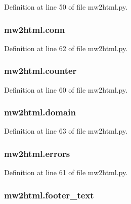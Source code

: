 Definition at line 50 of file mw2html.\+py.

\subsubsection[{\texorpdfstring{conn}{conn}}]{\setlength{\rightskip}{0pt plus 5cm}mw2html.\+conn}\hypertarget{namespacemw2html_a97cceba50a9da89b1bab3ff979d41a2b}{}\label{namespacemw2html_a97cceba50a9da89b1bab3ff979d41a2b}


Definition at line 62 of file mw2html.\+py.

\subsubsection[{\texorpdfstring{counter}{counter}}]{\setlength{\rightskip}{0pt plus 5cm}mw2html.\+counter}\hypertarget{namespacemw2html_a1883350fdf7ae46dbc49d9efc4dace3b}{}\label{namespacemw2html_a1883350fdf7ae46dbc49d9efc4dace3b}


Definition at line 60 of file mw2html.\+py.

\subsubsection[{\texorpdfstring{domain}{domain}}]{\setlength{\rightskip}{0pt plus 5cm}mw2html.\+domain}\hypertarget{namespacemw2html_a673cf42debbef44a18944c885b0e2f31}{}\label{namespacemw2html_a673cf42debbef44a18944c885b0e2f31}


Definition at line 63 of file mw2html.\+py.

\subsubsection[{\texorpdfstring{errors}{errors}}]{\setlength{\rightskip}{0pt plus 5cm}mw2html.\+errors}\hypertarget{namespacemw2html_a528858fd08982d70557f6c370383c876}{}\label{namespacemw2html_a528858fd08982d70557f6c370383c876}


Definition at line 61 of file mw2html.\+py.

\subsubsection[{\texorpdfstring{footer\+\_\+text}{footer_text}}]{\setlength{\rightskip}{0pt plus 5cm}mw2html.\+footer\+\_\+text}\hypertarget{namespacemw2html_a826a5658c74f288f0efba19ab6b5e9d5}{}\label{namespacemw2html_a826a5658c74f288f0efba19ab6b5e9d5}


